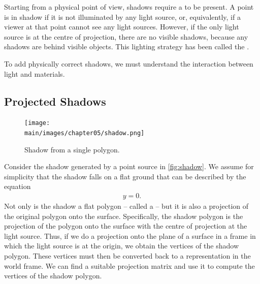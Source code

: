 \documentclass[../COS3712_Notes.tex]{subfiles}
\begin{document}
      Starting from a physical point of view, shadows require a 
      to be present.
      A point is in shadow if it is not illuminated by any light source,
      or, equivalently, if a viewer at that point cannot see any light sources.
      However, if the only light source is at the centre of projection, there are no visible
      shadows, because any shadows are behind visible objects.
      This lighting strategy has been called the .

      To add physically correct shadows, we must understand the interaction between
      light and materials.

      \pagebreak

      \subsection{Projected Shadows}
        \begin{figure}
          \begin{center}
            \texttt{[image: \\main/images/chapter05/shadow.png]}
          \end{center}
          \caption{Shadow from a single polygon.}
          \label{fig:shadow}
        \end{figure}

        Consider the shadow generated by a point source in \autoref{fig:shadow}.
        We assume for simplicity that the shadow falls on a flat ground that can be described
        by the equation
        \begin{align*}
          y = 0.
        \end{align*}
        Not only is the shadow a flat polygon -- called a  --
        but it is also a projection of the original polygon onto the surface.
        Specifically, the shadow polygon is the projection of the polygon onto the surface
        with the centre of projection at the light source.
        Thus, if we do a projection onto the plane of a surface in a frame in which
        the light source is at the origin, we obtain the vertices of the shadow polygon.
        These vertices must then be converted back to a representation in the world frame.
        We can find a suitable projection matrix and use it to compute the vertices
        of the shadow polygon.

\end{document}
